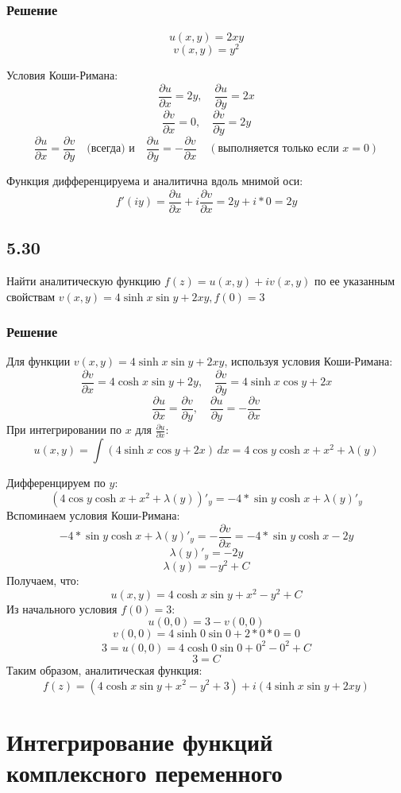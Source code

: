 \documentclass[12pt,a4paper]{article}
\begin{document}
\subsubsection*{Решение}
\[
  u(x, y) = 2xy
 \]
 \[
v(x, y) = y^2
 \]

Условия Коши-Римана:
\[
\frac{\partial u}{\partial x} = 2y, \quad \frac{\partial u}{\partial y} = 2x
\]
\[
\frac{\partial v}{\partial x} = 0, \quad \frac{\partial v}{\partial y} = 2y
\]
\[
\]
\[
\frac{\partial u}{\partial x} = \frac{\partial v}{\partial y} \quad \text{(всегда) и} \quad \frac{\partial u}{\partial y} = -\frac{\partial v}{\partial x} \quad (\text{выполняется только если } x = 0)
\]

Функция дифференцируема и аналитична вдоль мнимой оси:
\[
f'(iy) = \frac{\partial u}{\partial x}+i\frac{\partial v}{\partial x}=2y+i*0=2y
\]
\subsection*{5.30}
Найти аналитическую функцию $f(z)=u(x,y)+iv(x,y)$ по ее указанным свойствам 
$v(x,y)=4\sinh{x}\sin{y}+2xy, f(0)=3$
\subsubsection*{Решение}
Для функции \( v(x, y) = 4\sinh x \sin y + 2xy \), используя условия Коши-Римана:
\[
\frac{\partial v}{\partial x} = 4\cosh x \sin y + 2y, \quad \frac{\partial v}{\partial y} = 4\sinh x \cos y + 2x
\]
\[
\frac{\partial u}{\partial x} = \frac{\partial v}{\partial y}, \quad \frac{\partial u}{\partial y} = -\frac{\partial v}{\partial x}
\]
При интегрировании по \( x \) для \( \frac{\partial u}{\partial x} \):
\[
u(x, y) = \int (4 \sinh x \cos y + 2x) \, dx = 4 \cos y \cosh x + x^2 + \lambda(y)
\]

Дифференцируем по \( y \):
\[
(4 \cos y \cosh x + x^2 + \lambda(y))'_{y}=-4*\sin{y}\cosh{x}+\lambda(y)'_{y}
\]
Вспоминаем условия Коши-Римана:
\[
-4*\sin{y}\cosh{x}+\lambda(y)'_{y}=-\frac{\partial v}{\partial x}=-4*\sin{y}\cosh{x}-2y
\]
\[
\lambda(y)'_{y}=-2y
\]
\[
\lambda(y)=-y^2+C
\]
Получаем, что:
\[
u(x, y) = 4\cosh x \sin y + x^2 - y^2 + C
\]
Из начального условия \( f(0) = 3 \):
\[
u(0, 0) = 3 -v(0,0)
\]
\[
v(0, 0) = 4\sinh 0 \sin 0 + 2*0*0=0 
\]
\[
3=u(0, 0) = 4\cosh 0 \sin 0 + 0^2 - 0^2 + C
\]
\[
3=C
\]
Таким образом, аналитическая функция:
\[
f(z) = (4\cosh x \sin y + x^2 - y^2 + 3) + i(4\sinh x \sin y + 2xy)
\]
\section{Интегрирование функций комплексного переменного}
\end{document}
